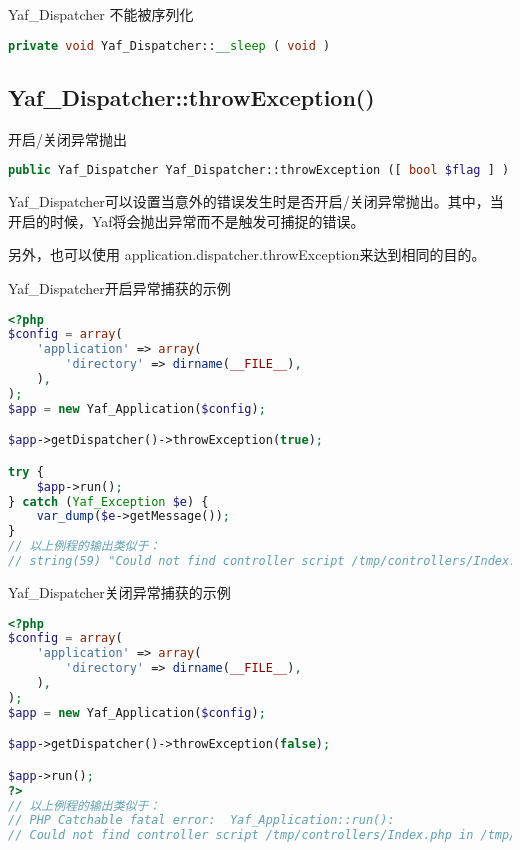 Yaf\_Dispatcher 不能被序列化

\begin{lstlisting}[language=PHP]
private void Yaf_Dispatcher::__sleep ( void )
\end{lstlisting}

\subsection{Yaf\_Dispatcher::throwException()}

开启/关闭异常抛出

\begin{lstlisting}[language=PHP]
public Yaf_Dispatcher Yaf_Dispatcher::throwException ([ bool $flag ] )
\end{lstlisting}

Yaf\_Dispatcher可以设置当意外的错误发生时是否开启/关闭异常抛出。其中，当开启的时候，Yaf将会抛出异常而不是触发可捕捉的错误。

另外，也可以使用 application.dispatcher.throwException来达到相同的目的。

\begin{example}
Yaf\_Dispatcher开启异常捕获的示例
\begin{lstlisting}[language=PHP]
<?php
$config = array(
    'application' => array(
        'directory' => dirname(__FILE__),
    ),
);
$app = new Yaf_Application($config);

$app->getDispatcher()->throwException(true);

try {
    $app->run();
} catch (Yaf_Exception $e) {
    var_dump($e->getMessage());
}
// 以上例程的输出类似于：
// string(59) "Could not find controller script /tmp/controllers/Index.php"
\end{lstlisting}
\end{example}


\begin{example}
Yaf\_Dispatcher关闭异常捕获的示例
\begin{lstlisting}[language=PHP]
<?php
$config = array(
    'application' => array(
        'directory' => dirname(__FILE__),
    ),
);
$app = new Yaf_Application($config);

$app->getDispatcher()->throwException(false);

$app->run();
?>
// 以上例程的输出类似于：
// PHP Catchable fatal error:  Yaf_Application::run(): 
// Could not find controller script /tmp/controllers/Index.php in /tmp/1.php on line 12
\end{lstlisting}
\end{example}


